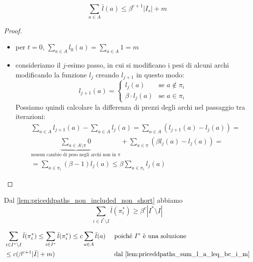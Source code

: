 \begin{lemma}\label{lem:priceddpaths_sum_l_a_leq_bc_i_m}
	$$
		\sum_{a \in A} \bar{l}(a) \leq \beta^{c+1} |I_s| + m
	$$
\end{lemma}
\begin{proof}
	\begin{itemize}
		\item per $t = 0$, $\sum_{a \in A} l_0(a) = \sum_{a \in A} 1  = m$
		\item consideriamo il $j$-esimo passo, in cui si modificano i pesi
		      di alcuni archi modificando la funzione $l_{j}$ creando
		      $l_{j+1}$ in questo modo:
		      $$
			      l_{j+1}(a) =
			      \begin{cases}
				      l_j(a)             & \text{se } a \notin \pi_i \\
				      \beta \cdot l_j(a) & \text{se } a \in \pi_i
			      \end{cases}
		      $$
		      Possiamo quindi calcolare la differenza di prezzi degli archi
		      nel passaggio tra iterazioni:
		      \begin{align*}
			       & \sum_{a\in A} l_{j+1}(a) - \sum_{a \in A} l_j (a) = \sum_{a \in A} (l_{j+1}(a) - l_{j}(a)) =      \\
			       & \underbrace{\sum_{a \in A\setminus{\pi}} 0}_{\text{nessun cambio di peso negli archi non in }\pi}
			      + \sum_{a \in \pi}(\beta l_{j}(a) - l_{j}(a)) =                                                      \\
			       & = \sum_{a \in \pi_i} (\beta -1 ) l_j (a) \leq \beta \sum_{a \in \pi_i}l_j(a)
		      \end{align*}
	\end{itemize}
\end{proof}

\begin{corollario}\label{cor:priceddpaths_cor_1}
	Dal \cref{lem:priceddpaths_non_included_non_short} abbiamo
	$$
		\sum_{i \in I^* \setminus I} \bar{l}(\pi_i^*) \geq \beta^c |I^*\setminus I|
	$$
\end{corollario}

\begin{corollario}\label{cor:priceddpaths_cor_2}
	\begin{align*}
		 & \sum_{i \in I^* \setminus I} \bar{l}(\pi_i^*) \leq \sum_{i \in I^*}\bar{l}(\pi_i^*) \leq c \sum_{a \in A} \bar{l}(a) &  & \text{ poiché  } I^* \text{ è una soluzione}           \\
		 & \leq c (\beta^{c+1}|\bar{I}|+m)                                                                                      &  & \text{ dal \cref{lem:priceddpaths_sum_l_a_leq_bc_i_m}}
	\end{align*}
\end{corollario}

